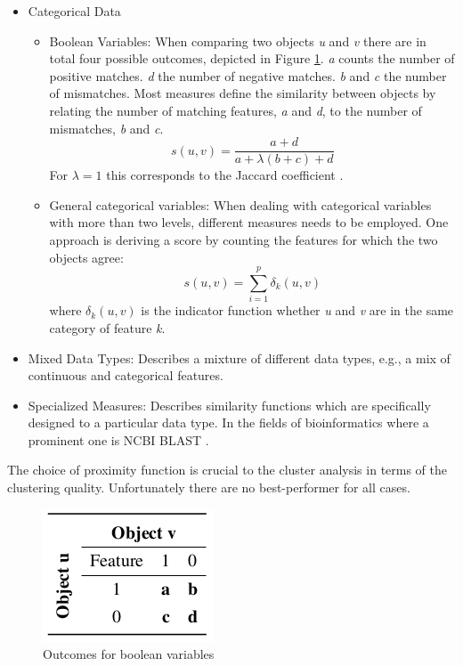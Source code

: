 \documentclass[a4paper,10pt]{article}
\theoremstyle{plain}
\theoremstyle{definition}
\begin{document}
\begin{itemize}
\begin{itemize}
		\end{itemize}
		\item Categorical Data
			\begin{itemize}
				\item Boolean Variables: When comparing two objects \textit{u} and \textit{v} there are in total four possible outcomes, depicted in Figure \ref{fig:booleanVariables}. \textit{a} counts the number of positive matches. \textit{d} the number of negative matches. \textit{b} and \textit{c} the number of mismatches. Most measures define the similarity between objects by relating the number of matching features, \textit{a} and \textit{d}, to the number of mismatches, \textit{b} and \textit{c}.
					\begin{equation*}
						s(u, v) = \frac{a + d}{a + \lambda(b + c) + d}
					\end{equation*}
				For $\lambda = 1$ this corresponds to the Jaccard coefficient \cite{52overview}.
				\item General categorical variables: When dealing with categorical variables with more than two levels, different measures needs to be employed. One approach is deriving a score by counting the features for which the two objects agree:
				\begin{equation*}
				s(u, v) = \sum_{i = 1}^{p} \delta_k(u, v)
				\end{equation*}
				where $\delta_k(u, v)$ is the indicator function whether \textit{u} and \textit{v} are in the same category of feature \textit{k}.
			\end{itemize}
		\item Mixed Data Types: Describes a mixture of different data types, e.g., a mix of continuous and categorical features.
		\item Specialized Measures: Describes similarity functions which are specifically designed to a particular data type. In the fields of bioinformatics where a prominent one is NCBI BLAST \cite{blast}.
\end{itemize}
The choice of proximity function is crucial to the cluster analysis in terms of the clustering quality. Unfortunately there are no best-performer for all cases.

\begin{figure}
	\centering
	\includegraphics[scale=0.4]{./pictures/booleanVariables.png}
	\caption{Outcomes for boolean variables \cite{clusteringOverview}}
	\label{fig:booleanVariables}
\end{figure}
\end{document}
